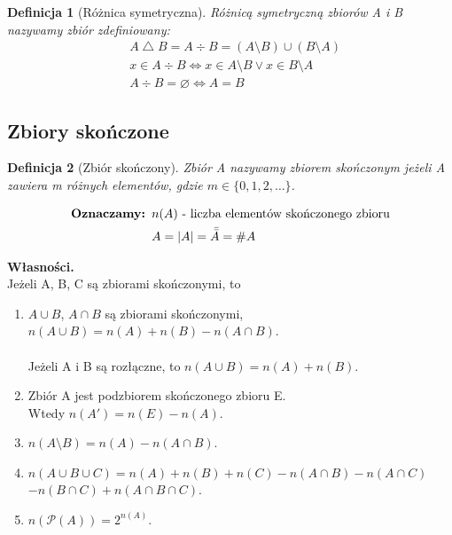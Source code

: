 \documentclass[a5paper,8pt]{article}
\theoremstyle{mythmstyle}
\newtheorem{definition}{Definicja}[section]
\newcommand\tab[1][1cm]{\hspace*{#1}}
\begin{document}
        \begin{definition}[Różnica symetryczna]
            Różnicą symetryczną zbiorów A i B nazywamy zbiór zdefiniowany:
            \begin{align*}
                & A \bigtriangleup B = A \div B = ( A \setminus B ) \cup ( B \setminus A ) \\
                & x \in A \div B \iff x \in A \setminus B \vee x \in B \setminus A \\
                & A \div B = \varnothing \iff A = B
            \end{align*}
        \end{definition}


        \pagebreak
        \subsection{Zbiory skończone} %
        \label{sub:zbiory_skończone}
            
        \begin{definition}[Zbiór skończony]
            Zbiór A nazywamy zbiorem skończonym jeżeli A zawiera m różnych elementów, gdzie $ m \in \{ 0, 1, 2, \ldots \} $.
        \end{definition}
        \begin{align*}
            \text{\textbf{Oznaczamy: }} & n(A) \text{ - liczba elementów skończonego zbioru} \\
            & A = |A| = \bar{\bar{A}} = \#A
        \end{align*}

        \textbf{Własności.} \\
        Jeżeli A, B, C są zbiorami skończonymi, to

        \begin{enumerate}
            \item $ A \cup B $, $ A \cap B $ są zbiorami skończonymi, \\
                  $ n(A \cup B) = n(A) + n(B) - n(A \cap B) $.\\\\
                  Jeżeli A i B są rozłączne, to $ n(A \cup B) = n(A) + n(B) $.
            \item Zbiór A jest podzbiorem skończonego zbioru E. \\
                  Wtedy $ n(A') = n(E) - n(A) $.
            \item $ n(A \setminus B) = n(A) - n(A \cap B) $.
            \item $ n(A \cup B \cup C) = n(A) + n(B) + n(C) - n(A \cap B) - n(A \cap C) $ \\ \tab\tab $ - n(B \cap C) + n(A \cap B \cap C) $.
            \item $ n(\mathcal{P}(A)) = 2^{n(A)} $.

        \end{enumerate}
\end{document}
